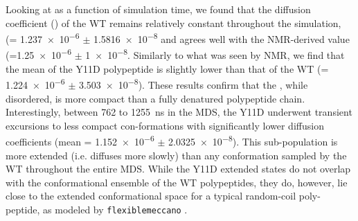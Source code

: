\begin{figure}
	\centering     %
	\label{fig:dctime}
\end{figure}

Looking at \diffusion as a function of simulation time, we found that the diffusion coefficient (\diffusion) of the WT \gct remains relatively constant throughout the simulation, (\diffusion = \num{1.237e-6} $\pm$ \SI{1.5816e-8}{\dcunits} and agrees well with the NMR-derived value (\diffusion=\num{1.25e-6} $\pm$  \SI{1e-8}{\dcunits}.  Similarly to what was seen by NMR, we find that the mean \diffusion of the Y11D \gct polypeptide is slightly lower than that of the WT \gct (\diffusion= \num{1.224e-6} $\pm$ \SI{3.503e-8}{\dcunits}). These results confirm that the \gct, while disordered, is more compact than a fully denatured polypeptide chain. Interestingly, between \num{762} to \SI{1255}{\ns} in the MDS, the Y11D \gct underwent transient excursions to less compact con-formations with significantly lower diffusion coefficients (mean \diffusion= \num{1.152e-6} $\pm$ \SI{2.0325e-8}{\dcunits}). This sub-population is more extended (i.e. diffuses more slowly) than any conformation sampled by the WT \gct throughout the entire MDS. While the Y11D \gct extended states do not overlap with the conformational ensemble of the WT \gct polypeptides, they do, however, lie close to the extended conformational space for a typical random-coil poly-peptide, as modeled by \texttt{flexiblemeccano} .

